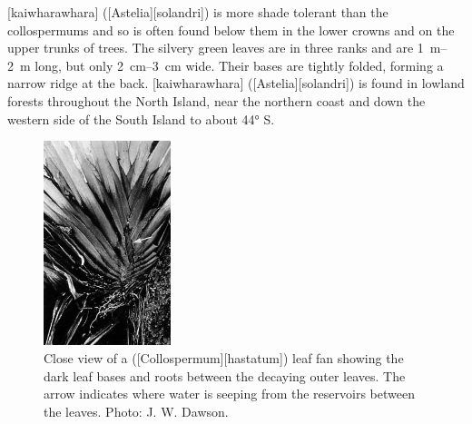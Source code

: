[kaiwharawhara] ([Astelia][solandri]) is more shade tolerant than the collospermums and so is often found below them in the lower crowns and on the upper trunks of trees.
The silvery green leaves are in three ranks and are \SIrange{1}{2}{\metre} long, but only \SIrange{2}{3}{\centi\metre} wide.
Their bases are tightly folded, forming a narrow ridge at the back.
[kaiwharawhara] ([Astelia][solandri]) is found in lowland forests throughout the North Island, near the northern coast and down the western side of the South Island to about \ang{44} S.

\begin{figure}
	\includegraphics[width=0.33\textwidth]{graphics/figure41collospermum.jpg}
	\centering
	\caption[Close view of a tank lily (\emph{Collospermum hastatum}) leaf fan]{Close view of a  ([Collospermum][hastatum]) leaf fan showing the dark leaf bases and roots between the decaying outer leaves.
	The arrow indicates where water is seeping from the reservoirs between the leaves.
	Photo: J. W. Dawson.}%
	\label{fig:41collospermum}
\end{figure}

